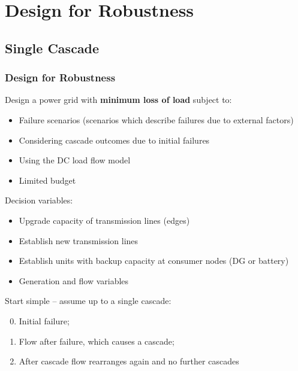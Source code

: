 \documentclass{beamer}
\begin{document}
\section{Design for Robustness}
\subsection{Single Cascade}\footnotesize
\begin{frame}
\frametitle{Design for Robustness}
Design a power grid with \textbf{minimum loss of load} subject to:
\begin{itemize}
	\item Failure scenarios (scenarios which describe failures due to external factors)
	\item Considering cascade outcomes due to initial failures
	\item Using the DC load flow model
	\item Limited budget
\end{itemize}\pause
Decision variables:
\begin{itemize}
	\item Upgrade capacity of transmission lines (edges)
	\item Establish new transmission lines
	\item Establish units with backup capacity at consumer nodes (DG or battery)
	\item Generation and flow variables
\end{itemize}\pause
Start simple -- assume up to a single cascade:
\begin{enumerate}
  \setcounter{enumi}{-1}
	\item Initial failure;
	\item Flow after failure, which causes a cascade; 
	\item After cascade flow rearranges again and no further cascades
\end{enumerate}
\end{frame}
\end{document}

